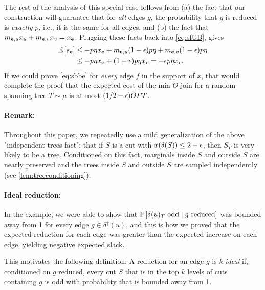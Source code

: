\begin{example}
The rest of the analysis of this special case follows  from (a) the fact that our construction will guarantee that for {\em all} edges $g$, the probability that $g$ is reduced is {\em exactly} $p$, i.e., it is the same for all edges, and 
(b) the fact that $m_{\bbe,u}x_u + m_{\bbe,v}x_v = x_\bbe$.
Plugging these facts back into \eqref{eq:sfUB}, gives
\begin{align}
\E{s_\bbe} &\le  -p \eta x_\bbe + m_{\bbe,u} (1-\eps) p \eta  + 
m_{\bbe,v} (1-\eps) p \eta \notag\\
& \le -p\eta x_\bbe + (1-\eps)p\eta x_\bbe =
 -\eps p\eta x_\bbe.	\label{eq:sbbe}
\end{align}
If we could prove \eqref{eq:sbbe} for {\em every} edge $f$ in the support of $x$, that would complete the proof that the expected cost of the min $O$-join for a random spanning tree $T\sim\mu$ is at most $(1/2 - \eps) OPT$.
\end{example}

\paragraph{Remark:} 
Throughout this paper, we repeatedly use a mild generalization of the above "independent trees fact": that if $S$ is a cut with $x(\delta(S)) \le 2 + \eps$, then $S_T$ is very likely to be a tree. Conditioned on this fact, marginals inside $S$ and outside $S$ are nearly preserved and the trees inside $S$ and outside $S$ are sampled independently (see \cref{lem:treeconditioning}).

\paragraph{Ideal reduction:}
In the example, we were able to show that $\P{\delta(u)_T \text{ odd} \mid g\text{ reduced}}$ was bounded away from 1 for every edge $g\in \delta^\uparrow(u)$, and this is how we proved that the expected reduction for each edge was greater than the expected increase on each edge, yielding negative expected slack. 

This motivates the following definition: A reduction for an edge $g$ is $k$-{\em ideal}
 if, conditioned on $g$ reduced, every cut $S$ that is in the top $k$ levels of cuts containing $g$  is odd with probability that is bounded away from 1. 


